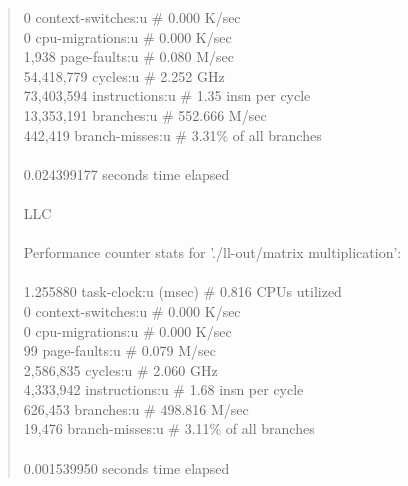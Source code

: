 \documentclass[12pt]{report}
\begin{document}
\begin{quote}
                 0      context-switches:u        \#    0.000 K/sec                  \\ 
                 0      cpu-migrations:u          \#    0.000 K/sec                  \\ 
             1,938      page-faults:u             \#    0.080 M/sec                  \\ 
        54,418,779      cycles:u                  \#    2.252 GHz                    \\ 
        73,403,594      instructions:u            \#    1.35  insn per cycle         \\ 
        13,353,191      branches:u                \#  552.666 M/sec                  \\ 
           442,419      branch-misses:u           \#    3.31\% of all branches       \\ 
                                                                                     \\ 
       0.024399177 seconds time elapsed                                              \\ 
                                                                                     \\ 
LLC                                                                                     \\ 
                                                                                     \\ 
 Performance counter stats for './ll-out/matrix multiplication':                     \\ 
                                                                                     \\ 
          1.255880      task-clock:u (msec)       \#    0.816 CPUs utilized          \\ 
                 0      context-switches:u        \#    0.000 K/sec                  \\ 
                 0      cpu-migrations:u          \#    0.000 K/sec                  \\ 
                99      page-faults:u             \#    0.079 M/sec                  \\ 
         2,586,835      cycles:u                  \#    2.060 GHz                    \\ 
         4,333,942      instructions:u            \#    1.68  insn per cycle         \\ 
           626,453      branches:u                \#  498.816 M/sec                  \\ 
            19,476      branch-misses:u           \#    3.11\% of all branches       \\ 
                                                                                     \\ 
       0.001539950 seconds time elapsed                                              \\ 
\end{quote}
\end{document}

